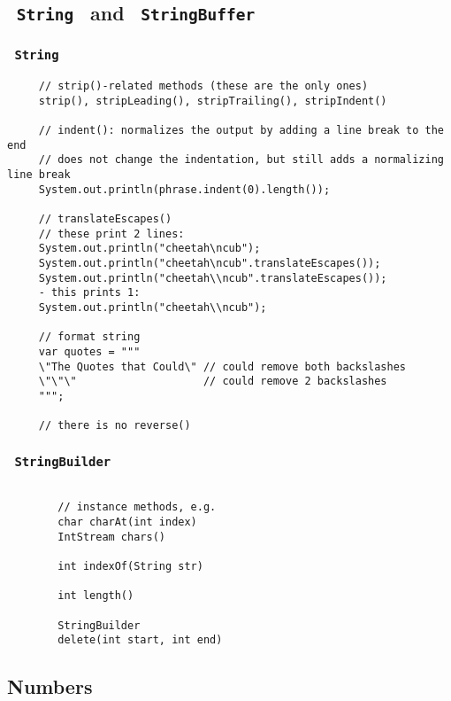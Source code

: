 \documentclass{scrartcl}
\begin{document}
 \subsection{\lstinline$ String $ and \lstinline$ StringBuffer $}
 \subsubsection{\lstinline$ String $}

    \begin{lstlisting}
     // strip()-related methods (these are the only ones)
     strip(), stripLeading(), stripTrailing(), stripIndent()

     // indent(): normalizes the output by adding a line break to the end
     // does not change the indentation, but still adds a normalizing line break
     System.out.println(phrase.indent(0).length());

     // translateEscapes()
     // these print 2 lines:
     System.out.println("cheetah\ncub");
     System.out.println("cheetah\ncub".translateEscapes());
     System.out.println("cheetah\\ncub".translateEscapes());
     - this prints 1:
     System.out.println("cheetah\\ncub");

     // format string
     var quotes = """
     \"The Quotes that Could\" // could remove both backslashes
     \"\"\"                    // could remove 2 backslashes
     """;

     // there is no reverse()
     \end{lstlisting}

 \subsubsection{\lstinline$ StringBuilder $}

    \begin{lstlisting}

        // instance methods, e.g.
        char charAt(int index)
        IntStream chars()

        int indexOf(String str)

        int length()

        StringBuilder
        delete(int start, int end)
    \end{lstlisting}

\subsection{Numbers}
\end{document}
